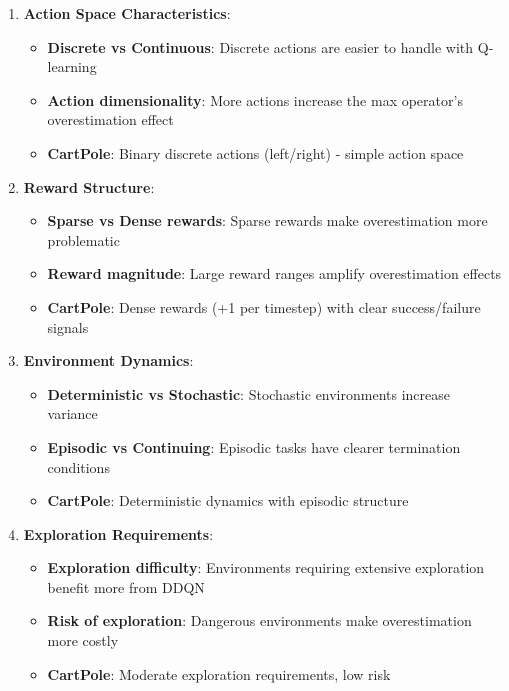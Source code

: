 \documentclass[12pt]{article}
\begin{document}
{{{\begin{enumerate}
    \item \textbf{Action Space Characteristics}:
    \begin{itemize}
        \item \textbf{Discrete vs Continuous}: Discrete actions are easier to handle with Q-learning
        \item \textbf{Action dimensionality}: More actions increase the max operator's overestimation effect
        \item \textbf{CartPole}: Binary discrete actions (left/right) - simple action space
    \end{itemize}
    
    \item \textbf{Reward Structure}:
    \begin{itemize}
        \item \textbf{Sparse vs Dense rewards}: Sparse rewards make overestimation more problematic
        \item \textbf{Reward magnitude}: Large reward ranges amplify overestimation effects
        \item \textbf{CartPole}: Dense rewards (+1 per timestep) with clear success/failure signals
    \end{itemize}
    
    \item \textbf{Environment Dynamics}:
    \begin{itemize}
        \item \textbf{Deterministic vs Stochastic}: Stochastic environments increase variance
        \item \textbf{Episodic vs Continuing}: Episodic tasks have clearer termination conditions
        \item \textbf{CartPole}: Deterministic dynamics with episodic structure
    \end{itemize}
    
    \item \textbf{Exploration Requirements}:
    \begin{itemize}
        \item \textbf{Exploration difficulty}: Environments requiring extensive exploration benefit more from DDQN
        \item \textbf{Risk of exploration}: Dangerous environments make overestimation more costly
        \item \textbf{CartPole}: Moderate exploration requirements, low risk
    \end{itemize}
\end{enumerate}

}}}
\end{document}
